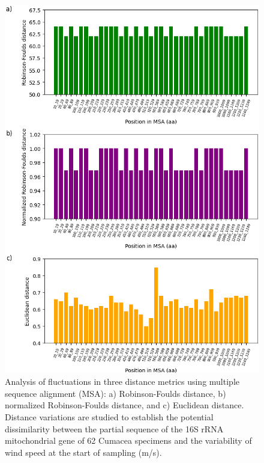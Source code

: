 \begin{figure}[h]
    \centering
    \includegraphics[width=\textwidth]{figure5.png}
     \caption{Analysis of fluctuations in three distance metrics using multiple sequence alignment (MSA): a) Robinson-Foulds distance, b) normalized Robinson-Foulds distance, and c) Euclidean distance. Distance variations are studied to establish the potential dissimilarity between the partial sequence of the 16S rRNA mitochondrial gene of 62 Cumacea specimens and the variability of wind speed at the start of sampling (m/s). \label{fig:fig7}}
\end{figure}

